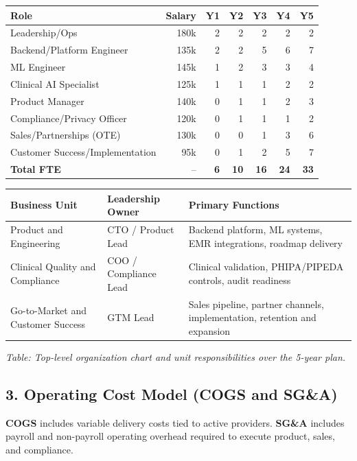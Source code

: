 \documentclass[11pt]{article}
\begin{document}
\begin{center}
\begin{tabular}{lrrrrrr}
\toprule
\textbf{Role} & \textbf{Salary} & \textbf{Y1} & \textbf{Y2} & \textbf{Y3} & \textbf{Y4} & \textbf{Y5} \\
\midrule
Leadership/Ops & 180k & 2 & 2 & 2 & 2 & 2 \\
Backend/Platform Engineer & 135k & 2 & 2 & 5 & 6 & 7 \\
ML Engineer & 145k & 1 & 2 & 3 & 3 & 4 \\
Clinical AI Specialist & 125k & 1 & 1 & 1 & 2 & 2 \\
Product Manager & 140k & 0 & 1 & 1 & 2 & 3 \\
Compliance/Privacy Officer & 120k & 0 & 1 & 1 & 1 & 2 \\
Sales/Partnerships (OTE) & 130k & 0 & 0 & 1 & 3 & 6 \\
Customer Success/Implementation & 95k & 0 & 1 & 2 & 5 & 7 \\
\midrule
\textbf{Total FTE} & -- & \textbf{6} & \textbf{10} & \textbf{16} & \textbf{24} & \textbf{33} \\
\bottomrule
\end{tabular}
\end{center}

\begin{center}
\begin{tabular}{p{} p{} p{}}
\toprule
\textbf{Business Unit} & \textbf{Leadership Owner} & \textbf{Primary Functions} \\
\midrule
Product and Engineering & CTO / Product Lead & Backend platform, ML systems, EMR integrations, roadmap delivery \\
Clinical Quality and Compliance & COO / Compliance Lead & Clinical validation, PHIPA/PIPEDA controls, audit readiness \\
Go-to-Market and Customer Success & GTM Lead & Sales pipeline, partner channels, implementation, retention and expansion \\
\bottomrule
\end{tabular}
\end{center}
\noindent\textit{Table: Top-level organization chart and unit responsibilities over the 5-year plan.}

\subsection*{3. Operating Cost Model (COGS and SG\&A)}
\textbf{COGS} includes variable delivery costs tied to active providers. \textbf{SG\&A} includes payroll and non-payroll operating overhead required to execute product, sales, and compliance.
\end{document}
